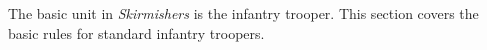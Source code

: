 The basic unit in \emph{Skirmishers} is the infantry trooper.
This section covers the basic rules for standard infantry troopers.
